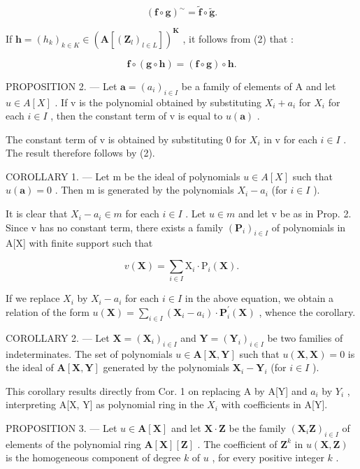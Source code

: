 \[
(\mathbf {f} \circ \mathbf {g}) ^ {\sim} = \tilde {\mathbf {f}} \circ \tilde {\mathbf {g}}.\tag{3}
\]

If \(\mathbf{h} = (h_k)_{k\in K}\in (\mathbf{A}[(\mathbf{Z}_l)_{l\in L}])^{\mathbf{K}}\) , it follows from (2) that :

\[
\mathbf {f} \circ (\mathbf {g} \circ \mathbf {h}) = (\mathbf {f} \circ \mathbf {g}) \circ \mathbf {h}.\tag{4}
\]

PROPOSITION 2. --- Let \(\mathbf{a} = (a_i)_{i \in I}\) be a family of elements of A and let \(u \in A[X]\) . If v is the polynomial obtained by substituting \(X_i + a_i\) for \(X_i\) for each \(i \in I\) , then the constant term of v is equal to \(u(\mathbf{a})\) .

The constant term of v is obtained by substituting 0 for \(X_{i}\) in v for each \(i \in I\) . The result therefore follows by (2).

COROLLARY 1. --- Let m be the ideal of polynomials \(u \in A[X]\) such that \(u(\mathbf{a}) = 0\) . Then m is generated by the polynomials \(X_{i} - a_{i}\) (for \(i \in I\) ).

It is clear that \(X_{i} - a_{i} \in m\) for each \(i \in I\) . Let \(u \in m\) and let v be as in Prop. 2. Since v has no constant term, there exists a family \((\mathbf{P}_{i})_{i \in I}\) of polynomials in A{[}X{]} with finite support such that

\[
v (\mathbf {X}) = \sum_ {i \in I} \mathrm{X} _ {i} \cdot \mathrm{P} _ {i} (\mathbf {X}).
\]

If we replace \(X_{i}\) by \(X_{i}-a_{i}\) for each \(i\in I\) in the above equation, we obtain a relation of the form \(u(\mathbf{X})=\sum_{i\in I}\left(\mathbf{X}_{i}-a_{i}\right)\cdot\mathbf{P}_{i}^{\prime}(\mathbf{X})\) , whence the corollary.

COROLLARY 2. --- Let \(\mathbf{X} = (\mathbf{X}_i)_{i \in I}\) and \(\mathbf{Y} = (\mathbf{Y}_i)_{i \in I}\) be two families of indeterminates. The set of polynomials \(u \in \mathbf{A}[\mathbf{X}, \mathbf{Y}]\) such that \(u(\mathbf{X}, \mathbf{X}) = 0\) is the ideal of \(\mathbf{A}[\mathbf{X}, \mathbf{Y}]\) generated by the polynomials \(\mathbf{X}_i - \mathbf{Y}_i\) (for \(i \in I\) ).

This corollary results directly from Cor. 1 on replacing A by A{[}Y{]} and \(a_{i}\) by \(Y_{i}\) , interpreting A{[}X, Y{]} as polynomial ring in the \(X_{i}\) with coefficients in A{[}Y{]}.

PROPOSITION 3. --- Let \(u \in \mathbf{A}[\mathbf{X}]\) and let \(\mathbf{X} \cdot \mathbf{Z}\) be the family \((\mathbf{X}_i\mathbf{Z})_{i \in I}\) of elements of the polynomial ring \(\mathbf{A}[\mathbf{X}][\mathbf{Z}]\) . The coefficient of \(\mathbf{Z}^k\) in \(u(\mathbf{X}, \mathbf{Z})\) is the homogeneous component of degree \(k\) of \(u\) , for every positive integer \(k\) .

